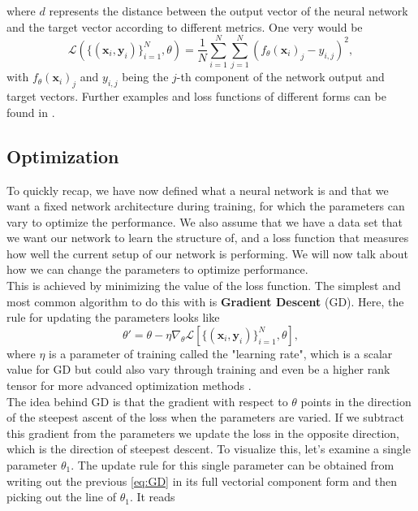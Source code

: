 where $d$ represents the distance between the output vector of the neural network and the target vector according to different metrics. One very would be 
\begin{equation}
	\mathscr{L}\left( \{(\mathbf{x}_i, \mathbf{y}_i)\}_{i=1}^{N}, \theta \right) = \frac{1}{N} \sum_{i=1}^{N} \sum_{j=1}^{N} \left(f_\theta(\mathbf{x}_i)_j - y_{i,j}\right)^2,
\end{equation}
with $f_\theta(\mathbf{x}_i)_j$ and $y_{i,j}$ being the $j$-th component of the network output and target vectors. Further examples and loss functions of different forms can be found in \cite{LossExamplePaper}.

\subsection{Optimization}\label{sec:NetworkOptimization}
To quickly recap, we have now defined what a neural network is and that we want a fixed network architecture during training, for which the parameters can vary to optimize the performance. We also assume that we have a data set that we want our network to learn the structure of, and a loss function that measures how well the current setup of our network is performing. We will now talk about how we can change the parameters to optimize performance.\\
This is achieved by minimizing the value of the loss function. The simplest and most common algorithm to do this with is \textbf{Gradient Descent} (GD). Here, the rule for updating the parameters looks like \cite{GradientDescentOverview}
\begin{equation}\label{eq:GD}
	\theta' = \theta - \eta \nabla_\theta \mathscr{L}\left[ \{(\mathbf{x}_i, \mathbf{y}_i)\}_{i=1}^{N}, \theta \right],
\end{equation}
where $\eta$ is a parameter of training called the "learning rate", which is a scalar value for GD but could also vary through training and even be a higher rank tensor for more advanced optimization methods \cite{ThePrinciplesOfDeepLearningTheory}.\\
The idea behind GD is that the gradient with respect to $\theta$ points in the direction of the steepest ascent of the loss when the parameters are varied. If we subtract this gradient from the parameters we update the loss in the opposite direction, which is the direction of steepest descent. To visualize this, let's examine a single parameter $\theta_1$. The update rule for this single parameter can be obtained from writing out the previous \cref{eq:GD} in its full vectorial component form and then picking out the line of $\theta_1$. It reads
